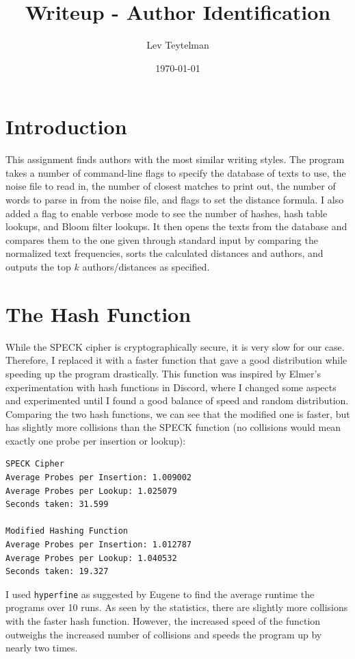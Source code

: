 \documentclass[12pt]{article}
\title{Writeup - Author Identification}
\author{Lev Teytelman}
\date{\today}
\begin{document}
\maketitle
\section{Introduction}
This assignment finds authors with the most similar writing styles. The program takes a number of command-line flags to specify the database of texts to use, the noise file to read in, the number of closest matches to print out, the number of words to parse in from the noise file, and flags to set the distance formula. I also added a flag to enable verbose mode to see the number of hashes, hash table lookups, and Bloom filter lookups. It then opens the texts from the database and compares them to the one given through standard input by comparing the normalized text frequencies, sorts the calculated distances and authors, and outputs the top $k$ authors/distances as specified.

\section{The Hash Function}
While the SPECK cipher is cryptographically secure, it is very slow for our case. Therefore, I replaced it with a faster function that gave a good distribution while speeding up the program drastically. This function was inspired by Elmer's experimentation with hash functions in Discord, where I changed some aspects and experimented until I found a good balance of speed and random distribution. Comparing the two hash functions, we can see that the modified one is faster, but has slightly more collisions than the SPECK function (no collisions would mean exactly one probe per insertion or lookup):
\begin{verbatim}
SPECK Cipher
Average Probes per Insertion: 1.009002
Average Probes per Lookup: 1.025079
Seconds taken: 31.599

Modified Hashing Function
Average Probes per Insertion: 1.012787
Average Probes per Lookup: 1.040532
Seconds taken: 19.327
\end{verbatim}
I used \verb|hyperfine| as suggested by Eugene to find the average runtime the programs over 10 runs. As seen by the statistics, there are slightly more collisions with the faster hash function. However, the increased speed of the function outweighs the increased number of collisions and speeds the program up by nearly two times.
\end{document}
